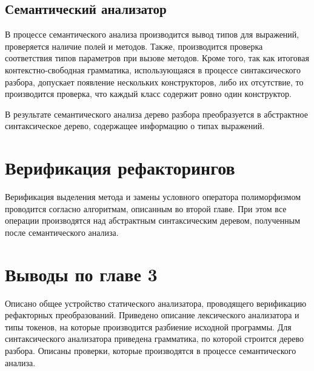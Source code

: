 \subsection{Семантический анализатор}
В процессе семантического анализа производится вывод типов для выражений, проверяется наличие полей и методов.
Также, производится проверка соответствия типов параметров при вызове методов.
Кроме того, так как итоговая контекстно-свободная грамматика, использующаяся в процессе синтаксического разбора,
допускает появление нескольких конструкторов, либо их отсутствие, то производится проверка,
что каждый класс содержит ровно один конструктор.

В результате семантического анализа дерево разбора преобразуется в абстрактное синтаксическое дерево,
содержащее информацию о типах выражений.
\section{Верификация рефакторингов}
Верификация выделения метода и замены условного оператора полиморфизмом проводится согласно алгоритмам, описанным во второй главе.
При этом все операции производятся над абстрактным синтаксическим деревом, полученным после семантического анализа.
\section*{Выводы по главе 3}
Описано общее устройство статического анализатора, проводящего верификацию рефакторных преобразований.
Приведено описание лексического анализатора и типы токенов, на которые производится разбиение исходной программы.
Для синтаксического анализатора приведена грамматика, по которой строится дерево разбора.
Описаны проверки, которые производятся в процессе семантического анализа.